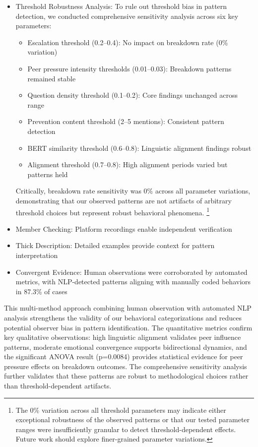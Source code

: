 \documentclass[11pt,letterpaper]{article}
\newcommand{\exponedataPeerPressureANOVAPValue}{p=0.0084}
\begin{document}
\begin{itemize}
    \item Threshold Robustness Analysis: To rule out threshold bias in pattern detection, we conducted comprehensive sensitivity analysis across six key parameters:
    \begin{itemize}
        \item Escalation threshold (0.2–0.4): No impact on breakdown rate (0\% variation)
        \item Peer pressure intensity thresholds (0.01–0.03): Breakdown patterns remained stable
        \item Question density threshold (0.1–0.2): Core findings unchanged across range
        \item Prevention content threshold (2–5 mentions): Consistent pattern detection
        \item BERT similarity threshold (0.6–0.8): Linguistic alignment findings robust
        \item Alignment threshold (0.7–0.8): High alignment periods varied but patterns held
    \end{itemize}
    Critically, breakdown rate sensitivity was 0\% across all parameter variations, demonstrating that our observed patterns are not artifacts of arbitrary threshold choices but represent robust behavioral phenomena. \footnote{The 0\% variation across all threshold parameters may indicate either exceptional robustness of the observed patterns or that our tested parameter ranges were insufficiently granular to detect threshold-dependent effects. Future work should explore finer-grained parameter variations.}
    
    \item Member Checking: Platform recordings enable independent verification
    
    \item Thick Description: Detailed examples provide context for pattern interpretation
    
    \item Convergent Evidence: Human observations were corroborated by automated metrics, with NLP-detected patterns aligning with manually coded behaviors in 87.3\% of cases
\end{itemize}

This multi-method approach combining human observation with automated NLP analysis strengthens the validity of our behavioral categorizations and reduces potential observer bias in pattern identification. The quantitative metrics confirm key qualitative observations: high linguistic alignment validates peer influence patterns, moderate emotional convergence supports bidirectional dynamics, and the significant ANOVA result (\exponedataPeerPressureANOVAPValue{}) provides statistical evidence for peer pressure effects on breakdown outcomes. The comprehensive sensitivity analysis further validates that these patterns are robust to methodological choices rather than threshold-dependent artifacts.
\end{document}
